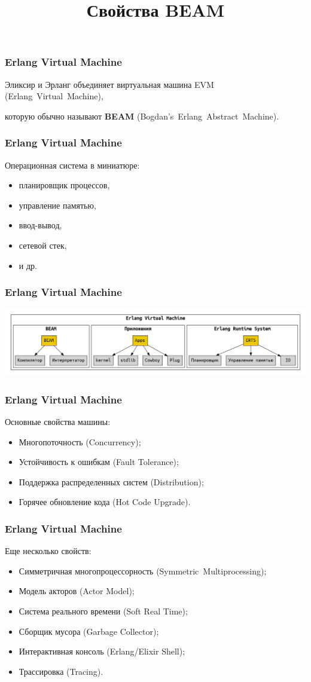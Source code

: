 \documentclass[10pt]{beamer}
\title{Свойства BEAM}
\begin{document}
\begin{frame}
  \frametitle{Erlang Virtual Machine}
  Эликсир и Эрланг объединяет виртуальная машина EVM (Erlang~Virtual~Machine),
  \par \bigskip
  которую обычно называют \textbf{BEAM} (Bogdan's~Erlang~Abstract~Machine).
\end{frame}

\begin{frame}
  \frametitle{Erlang Virtual Machine}
  Операционная система в миниатюре:
  \begin{itemize}
  \item планировщик процессов,
  \item управление памятью,
  \item ввод-вывод,
  \item сетевой стек,
  \item и др.
  \end{itemize}
\end{frame}

\begin{frame}
  \frametitle{Erlang Virtual Machine}
  \includegraphics[scale=0.2]{evm}
\end{frame}

\begin{frame}
  \frametitle{Erlang Virtual Machine}
  Основные свойства машины:
  \begin{itemize}
  \item Многопоточность (Concurrency);
  \item Устойчивость к ошибкам (Fault Tolerance);
  \item Поддержка распределенных систем (Distribution);
  \item Горячее обновление кода (Hot Code Upgrade).
  \end{itemize}
\end{frame}

\begin{frame}
  \frametitle{Erlang Virtual Machine}
  Еще несколько свойств:
  \begin{itemize}
  \item Симметричная многопроцессорность (Symmetric~Multiprocessing);
  \item Модель акторов (Actor Model);
  \item Система реального времени (Soft Real Time);
  \item Сборщик мусора (Garbage Collector);
  \item Интерактивная консоль (Erlang/Elixir Shell);
  \item Трассировка (Tracing).
  \end{itemize}
\end{frame}
\end{document}
